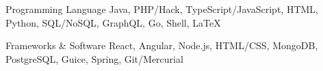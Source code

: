 


\begin{cvskills}


\cvskill
{Programming Language} %
{Java, PHP/Hack, TypeScript/JavaScript, HTML, Python, SQL/NoSQL, GraphQL, Go, Shell, \textrm{\LaTeX}} %


\cvskill
{Frameworks \& Software} %
{React, Angular, Node.js, HTML/CSS, MongoDB, PostgreSQL, Guice, Spring, Git/Mercurial} %


\end{cvskills}